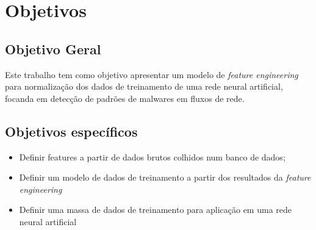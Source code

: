 \chapter[Objetivos]{Objetivos}

\section{Objetivo Geral}
    Este trabalho tem como objetivo apresentar um modelo de \textit{feature engineering} para normalização dos dados de treinamento de uma rede neural artificial, focanda em detecção de padrões de malwares em fluxos de rede.


\section{Objetivos específicos}
    \begin{itemize}
        \item Definir features a partir de dados brutos colhidos num banco de dados;
        \item Definir um modelo de dados de treinamento a partir dos resultados da \textit{feature engineering}
        \item Definir uma massa de dados de treinamento para aplicação em uma rede neural artificial
    \end{itemize}
